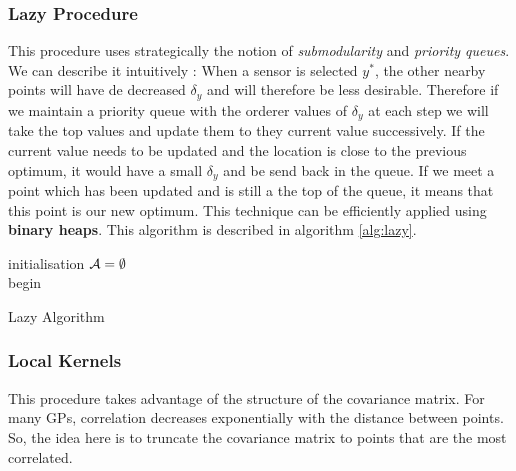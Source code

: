 \documentclass[12pt,twoside]{report}
\begin{document}
\subsubsection{Lazy Procedure} This procedure uses strategically the notion of \textit{submodularity} and \textit{priority queues}. We can describe it intuitively : When a sensor is selected $y^*$, the other nearby points will have de decreased $\delta_y$ and will therefore be less desirable. Therefore if we maintain a priority queue with the orderer values of $\delta_y$ at each step we will take the top values and update them to they current value successively. If the current value needs to be updated and the location is close to the previous optimum, it would have a small $\delta_y$ and be send back in the queue. If we meet a point which has been updated and is still a the top of the queue, it means that this point is our new optimum. This technique can be efficiently applied using \textbf{binary heaps}. This algorithm is described in algorithm \ref{alg:lazy}. \\ 


\begin{algorithm}[h]
 initialisation\;
 $\mathcal{A} = \emptyset$ \\
 begin\;
\caption{Lazy Algorithm}
\label{alg:lazy}
\end{algorithm}

\subsubsection{Local Kernels} This procedure takes advantage of the structure of the covariance matrix. For many GPs, correlation decreases exponentially with the distance between points. So, the idea here is to truncate the covariance matrix to points that are the most correlated. \\ 
\end{document}
